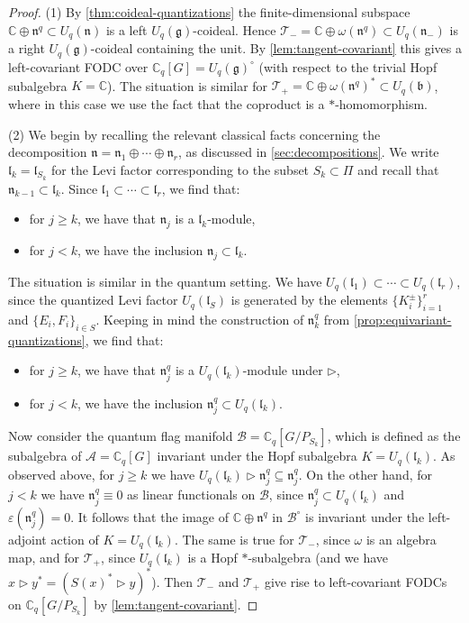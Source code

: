 \documentclass[a4paper, 12pt, reqno, english]{amsart}
\numberwithin{equation}{section}
\numberwithin{figure}{section}
\theoremstyle{plain}
\theoremstyle{plain}
\theoremstyle{plain}
\theoremstyle{plain}
\theoremstyle{plain}
\theoremstyle{definition}
\theoremstyle{definition}
\theoremstyle{definition}
\theoremstyle{remark}
\theoremstyle{definition}
\theoremstyle{definition}
\newcommand{\Uqb}{U_q(\mathfrak{b})}
\newcommand{\Uqg}{U_q(\mathfrak{g})}
\newcommand{\Uqn}{U_q(\mathfrak{n})}
\newcommand{\Uqnm}{U_q(\mathfrak{n}_-)}
\newcommand{\UqlS}{U_q(\mathfrak{l}_S)}
\newcommand{\Uqlk}{U_q(\mathfrak{l}_k)}
\newcommand{\bbC}{\mathbb{C}}
\newcommand{\liel}{\mathfrak{l}}
\newcommand{\lien}{\mathfrak{n}}
\newcommand{\calA}{\mathcal{A}}
\newcommand{\calB}{\mathcal{B}}
\newcommand{\simpleroots}{\Pi}
\newcommand{\qnil}{\lien^q}
\newcommand{\Cq}{\mathbb{C}_q}
\newcommand{\tang}{\mathcal{T}}
\begin{document}
\begin{proof}
(1) By \cref{thm:coideal-quantizations} the finite-dimensional subspace $\bbC \oplus \qnil \subset \Uqn$ is a left $\Uqg$-coideal.
Hence $\tang_- = \bbC \oplus \omega(\qnil) \subset \Uqnm$ is a right $\Uqg$-coideal containing the unit.
By \cref{lem:tangent-covariant} this gives a left-covariant FODC over $\Cq[G] = \Uqg^\circ$ (with respect to the trivial Hopf subalgebra $K = \bbC$).
The situation is similar for $\tang_+ = \bbC \oplus \omega(\qnil)^* \subset \Uqb$, where in this case we use the fact that the coproduct is a $*$-homomorphism.

(2) We begin by recalling the relevant classical facts concerning the decomposition $\lien = \lien_1 \oplus \cdots \oplus \lien_r$, as discussed in \cref{sec:decompositions}.
We write $\liel_k = \liel_{S_k}$ for the Levi factor corresponding to the subset $S_k \subset \simpleroots$ and recall that $\lien_{k - 1} \subset \liel_k$.
Since $\liel_1 \subset \cdots \subset \liel_r$, we find that:
\begin{itemize}
\item for $j \geq k$, we have that $\lien_j$ is a $\liel_k$-module,
\item for $j < k$, we have the inclusion $\lien_j \subset \liel_k$.
\end{itemize}
The situation is similar in the quantum setting.
We have $U_q(\liel_1) \subset \cdots \subset U_q(\liel_r)$, since the quantized Levi factor $\UqlS$ is generated by the elements $\{ K_i^{\pm} \}_{i = 1}^r$ and $\{ E_i, F_i \}_{i \in S}$.
Keeping in mind the construction of $\qnil_k$ from \cref{prop:equivariant-quantizations}, we find that:
\begin{itemize}
\item for $j \geq k$, we have that $\qnil_j$ is a $\Uqlk$-module under $\triangleright$,
\item for $j < k$, we have the inclusion $\qnil_j \subset \Uqlk$.
\end{itemize}

Now consider the quantum flag manifold $\calB = \Cq[G / P_{S_k}]$, which is defined as the subalgebra of $\calA = \Cq[G]$ invariant under the Hopf subalgebra $K = \Uqlk$.
As observed above, for $j \geq k$ we have $\Uqlk \triangleright \qnil_j \subseteq \qnil_j$.
On the other hand, for $j < k$ we have $\qnil_j \equiv 0$ as linear functionals on $\calB$, since $\qnil_j \subset \Uqlk$ and $\varepsilon(\qnil_j) = 0$.
It follows that the image of $\bbC \oplus \qnil$ in $\calB^\circ$ is invariant under the left-adjoint action of $K = \Uqlk$.
The same is true for $\tang_-$, since $\omega$ is an algebra map, and for $\tang_+$, since $\Uqlk$ is a Hopf $*$-subalgebra (and we have $x \triangleright y^* = (S(x)^* \triangleright y)^*$).
Then $\tang_-$ and $\tang_+$ give rise to left-covariant FODCs on $\Cq[G / P_{S_k}]$ by \cref{lem:tangent-covariant}.
\end{proof}
\end{document}
